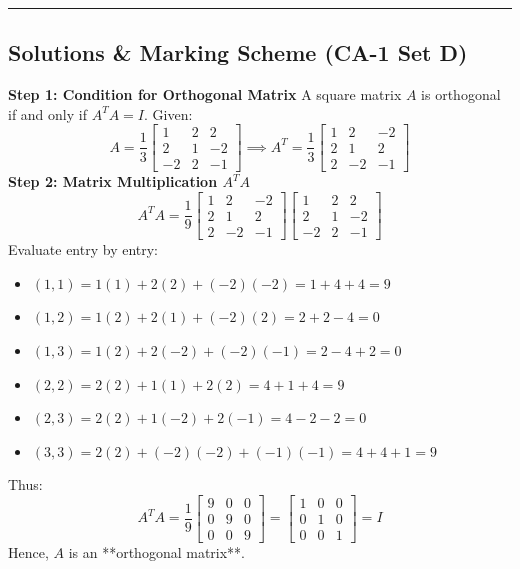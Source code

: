 \vspace{5mm}
\hrule
\vspace{5mm}

\subsection*{Solutions \& Marking Scheme (CA-1 Set D)}

\begin{solutionbox}
\textbf{Step 1: Condition for Orthogonal Matrix}
A square matrix $A$ is orthogonal if and only if $A^T A = I$.
Given:
\[
A = \frac{1}{3}\begin{bmatrix} 1 & 2 & 2 \\ 2 & 1 & -2 \\ -2 & 2 & -1 \end{bmatrix} \implies A^T = \frac{1}{3}\begin{bmatrix} 1 & 2 & -2 \\ 2 & 1 & 2 \\ 2 & -2 & -1 \end{bmatrix}
\]
\textbf{Step 2: Matrix Multiplication $A^T A$}
\[
A^T A = \frac{1}{9}\begin{bmatrix} 1 & 2 & -2 \\ 2 & 1 & 2 \\ 2 & -2 & -1 \end{bmatrix} \begin{bmatrix} 1 & 2 & 2 \\ 2 & 1 & -2 \\ -2 & 2 & -1 \end{bmatrix}
\]
Evaluate entry by entry:
\begin{itemize}[leftmargin=6mm]
    \item $(1,1) = 1(1) + 2(2) + (-2)(-2) = 1 + 4 + 4 = 9$
    \item $(1,2) = 1(2) + 2(1) + (-2)(2) = 2 + 2 - 4 = 0$
    \item $(1,3) = 1(2) + 2(-2) + (-2)(-1) = 2 - 4 + 2 = 0$
    \item $(2,2) = 2(2) + 1(1) + 2(2) = 4 + 1 + 4 = 9$
    \item $(2,3) = 2(2) + 1(-2) + 2(-1) = 4 - 2 - 2 = 0$
    \item $(3,3) = 2(2) + (-2)(-2) + (-1)(-1) = 4 + 4 + 1 = 9$
\end{itemize}
Thus:
\[
A^T A = \frac{1}{9}\begin{bmatrix} 9 & 0 & 0 \\ 0 & 9 & 0 \\ 0 & 0 & 9 \end{bmatrix} = \begin{bmatrix} 1 & 0 & 0 \\ 0 & 1 & 0 \\ 0 & 0 & 1 \end{bmatrix} = I
\]
Hence, $A$ is an **orthogonal matrix**.


\end{solutionbox}
